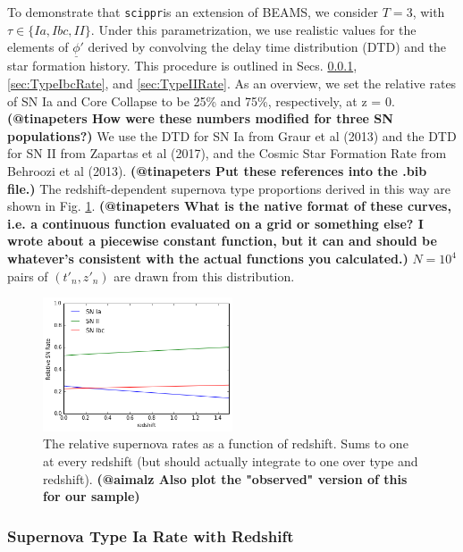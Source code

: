 \documentclass[12pt, onecolumn]{emulateapj}
\newcommand{\textul}{\underline}
\newcommand{\scippr}{\texttt{scippr}}
\begin{document}
To demonstrate that \scippr is an extension of BEAMS, we consider $T=3$, with $\tau\in\{Ia, Ibc, II\}$.  Under this parametrization, we use realistic values for the elements of $\textul{\phi}'$ derived by convolving the delay time distribution (DTD) and the star formation history.  This procedure is outlined in Secs. \ref{sec:TypeIaRate}, \ref{sec:TypeIbcRate}, and \ref{sec:TypeIIRate}.  As an overview, we set the relative rates of SN Ia and Core Collapse to be 25\% and 75\%, respectively, at z = 0.  \textbf{(@tinapeters How were these numbers modified for three SN populations?)}  We use the DTD for SN Ia from Graur et al (2013) and the DTD for SN II from Zapartas et al (2017), and the Cosmic Star Formation Rate from Behroozi et al (2013).  \textbf{(@tinapeters Put these references into the .bib file.)}  The redshift-dependent supernova type proportions derived in this way are shown in Fig. \ref{fig:relative_supernova_rates}.  \textbf{(@tinapeters What is the native format of these curves, i.e. a continuous function evaluated on a grid or something else?  I wrote about a piecewise constant function, but it can and should be whatever's consistent with the actual functions you calculated.)}  $N=10^{4}$ pairs of $(t'_{n}, z'_{n})$ are drawn from this distribution.

\begin{figure}
	\begin{center}
		\includegraphics[width=0.5\textwidth]{fig/relative_supernova_rate.png}
		\caption{The relative supernova rates as a function of redshift. Sums to one at every redshift (but should actually integrate to one over type and redshift).  \textbf{(@aimalz Also plot the "observed" version of this for our sample)}}
		\label{fig:relative_supernova_rates}
	\end{center}
\end{figure}

\subsubsection{Supernova Type Ia Rate with Redshift}
\label{sec:TypeIaRate}
\end{document}

